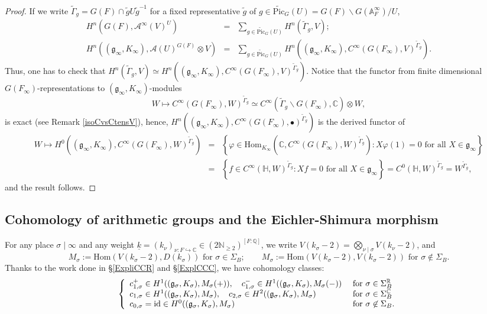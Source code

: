 \documentclass{amsart}
\theoremstyle{definition}
\theoremstyle{remark}
\numberwithin{equation}{section}
\newcommand{\Pic}{\mathrm{Pic}}
\newcommand{\A}{{\mathbb A}}
\newcommand{\Q}{{\mathbb Q}}
\newcommand{\C}{{\mathbb C}}
\newcommand{\R}{{\mathbb R}}
\newcommand{\N}{{\mathbb N}}
\newcommand{\cA}{{\mathcal A}}
\newcommand{\mfg}{{\mathfrak g}}
\newcommand{\Hom}{{\mathrm {Hom}}}
\begin{document}
\begin{proof}
    
    If we write $\tilde \Gamma_g=G(F)\cap \tilde gU\tilde g^{-1}$ for a fixed representative $\tilde g$ of $g\in \widetilde{\Pic}_G(U)=G(F)\backslash G(\A_F^\infty)/U$, 
    \begin{eqnarray*}
    H^n(G(F),\cA^\infty(V)^U)&=&\sum_{g\in \widetilde{\Pic}_G(U)} H^n(\tilde\Gamma_g,V);\\
    H^n((\mfg_\infty,K_{\infty}),\cA(U)^{G(F)}\otimes V)&=&\sum_{g\in \widetilde{\Pic}_G(U)}H^n((\mfg_\infty,K_{\infty}),C^\infty(G(F_\infty),V)^{\tilde\Gamma_g}).
    \end{eqnarray*}
    Thus, one has to check that $H^n(\tilde\Gamma_g,V)\simeq H^n((\mfg_\infty,K_{\infty}),C^\infty(G(F_\infty),V)^{\tilde\Gamma_g})$. Notice that the functor from finite dimensional $G(F_\infty)$-representations to $(\mfg_\infty,K_{\infty})$-modules 
    \[
    W\longmapsto C^\infty(G(F_\infty),W)^{\tilde\Gamma_g}\simeq C^\infty(\tilde \Gamma_g\backslash G(F_\infty),\C)\otimes W,
    \]
     is exact (see Remark \ref{isoCvsCtensV}), hence, $H^n((\mfg_\infty,K_{\infty}),C^\infty(G(F_\infty),\bullet)^{\tilde\Gamma_g})$ is the derived functor of 
     \begin{eqnarray*}
         W\longmapsto H^0((\mfg_\infty,K_{\infty}),C^\infty(G(F_\infty),W)^{\tilde\Gamma_g})&=&\left\{\varphi\in \Hom_{K_\infty}(\C,C^\infty(G(F_\infty),W)^{\tilde\Gamma_g})\colon  X\varphi(1)=0 \mbox{ for all }X\in \mfg_\infty\right\}\\
         &=&\left\{f\in C^\infty(\mathbb{H},W)^{\tilde\Gamma_g}\colon  Xf=0 \mbox{ for all }X\in \mfg_\infty\right\}=C^0(\mathbb{H},W)^{\tilde\Gamma_g}=W^{\tilde\Gamma_g},
     \end{eqnarray*}
     and the result follows.
\end{proof}
\subsection{Cohomology of arithmetic groups and the Eichler-Shimura morphism}\label{cohoAG}

For any place $\sigma\mid\infty$ and any weight $\underline k=(k_{\nu})_{\nu:F\hookrightarrow\C}\in (2\N_{\geq 2})^{[F:\Q]}$, we write $V(k_\sigma-2)=\bigotimes_{\nu\mid\sigma}V(k_{\nu}-2)$, and
\[
M_\sigma:=\Hom(V(k_\sigma-2),D(k_\sigma))\text{ for } \sigma\in\Sigma_B;\qquad M_\sigma:=\Hom(V(k_\sigma-2),V(k_\sigma-2))\text{ for }  \sigma\not\in\Sigma_B.
\]
Thanks to the work done in \S \ref{ExpliCCR} and \S \ref{ExplCCC}, we have cohomology classes:
\[
\left\{\begin{array}{ll}
     c_{1,\sigma}^+\in H^1((\mfg_\sigma,K_\sigma),M_\sigma(+)),\quad c_{1,\sigma}^-\in H^1((\mfg_\sigma,K_\sigma),M_\sigma(-))&\text{ for } \sigma\in\Sigma_B^\R  \\
     c_{1,\sigma}\in H^1((\mfg_\sigma,K_\sigma),M_\sigma),\quad c_{2,\sigma}\in H^2((\mfg_\sigma,K_\sigma),M_\sigma)&\text{ for } \sigma\in\Sigma_B^\C\\
     c_{0,\sigma}={\rm id}\in H^0((\mfg_\sigma,K_\sigma),M_\sigma)& \text{ for } \sigma\not\in\Sigma_B. 
\end{array}\right.
\]
\end{document}
